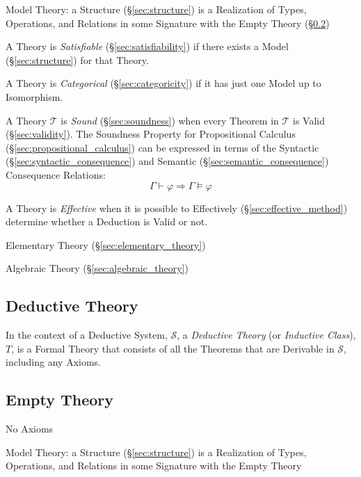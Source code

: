 Model Theory: a Structure (\S\ref{sec:structure}) is a Realization of
Types, Operations, and Relations in some Signature with the Empty
Theory (\S\ref{sec:empty_theory})

A Theory is \emph{Satisfiable} (\S\ref{sec:satisfiability}) if there
exists a Model (\S\ref{sec:structure}) for that Theory.

A Theory is \emph{Categorical} (\S\ref{sec:categoricity}) if it has
just one Model up to Isomorphism.

A Theory $\mathcal{T}$ is \emph{Sound} (\S\ref{sec:soundness}) when
every Theorem in $\mathcal{T}$ is Valid (\S\ref{sec:validity}). The
Soundness Property for Propositional Calculus
(\S\ref{sec:propositional_calculus}) can be expressed in terms of the
Syntactic (\S\ref{sec:syntactic_consequence}) and Semantic
(\S\ref{sec:semantic_consequence}) Consequence Relations:
\[
  \Gamma \vdash \varphi \Rightarrow \Gamma \vDash \varphi
\]

A Theory is \emph{Effective} when it is possible to Effectively
(\S\ref{sec:effective_method}) determine whether a Deduction is Valid
or not.

Elementary Theory (\S\ref{sec:elementary_theory})

Algebraic Theory (\S\ref{sec:algebraic_theory})



\subsection{Deductive Theory}\label{sec:deductive_theory}

In the context of a Deductive System, $\mathcal{S}$, a \emph{Deductive
  Theory} (or \emph{Inductive Class}), $T$, is a Formal Theory that
consists of all the Theorems that are Derivable in $\mathcal{S}$,
including any Axioms.



\subsection{Empty Theory}\label{sec:empty_theory}

No Axioms

Model Theory: a Structure (\S\ref{sec:structure}) is a Realization of
Types, Operations, and Relations in some Signature with the Empty
Theory



